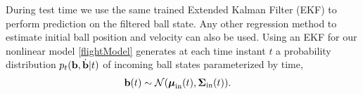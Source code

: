 During test time we use the same trained Extended Kalman Filter (EKF) to perform prediction on the filtered ball state. Any other regression method to estimate initial ball position and velocity can also be used. Using an EKF for our nonlinear model \eqref{flightModel} generates at each time instant $t$ a probability distribution $p_t(\boldsymbol{\mathrm{b}},\dot{\boldsymbol{\mathrm{b}}}|t)$ of incoming ball states parameterized by time, 
%
\begin{align}
\boldsymbol{\mathrm{b}}(t) &\sim \mathcal{N}(\boldsymbol{\mathrm{\mu}}_{\textrm{in}}(t),\boldsymbol{\mathrm{\Sigma}}_{\textrm{in}}(t)). 
\label{ballProcess}
\end{align}

